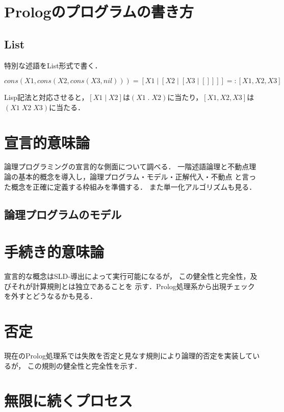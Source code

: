 \documentclass[uplatex, dvipdfmx]{jsreport}
\begin{document}
\section{Prologのプログラムの書き方}

\subsection{List}
特別な述語をList形式で書く．
\begin{definition}[list記法]
    \[cons(X1,cons(X2,cons(X3,nil))) = [X1\mid[X2\mid[X3\mid[]]]] =: [X1,X2,X3]\]
\end{definition}
\begin{remark}
    Lisp記法と対応させると，$[X1\mid X2]$は$(X1\;.\;X2)$に当たり，$[X1,X2,X3]$は$(X1\;X2\;X3)$に当たる．
\end{remark}

\section{宣言的意味論}

論理プログラミングの宣言的な側面について調べる．
一階述語論理と不動点理論の基本的概念を導入し，論理プログラム・モデル・正解代入・不動点
と言った概念を正確に定義する枠組みを準備する．
また単一化アルゴリズムも見る．

\subsection{論理プログラムのモデル}

\section{手続き的意味論}

宣言的な概念はSLD-導出によって実行可能になるが，
この健全性と完全性，及びそれが計算規則とは独立であることを
示す．Prolog処理系から出現チェックを外すとどうなるかも見る．

\section{否定}

現在のProlog処理系では失敗を否定と見なす規則により論理的否定を実装しているが，
この規則の健全性と完全性を示す．

\section{無限に続くプロセス}
\end{document}
